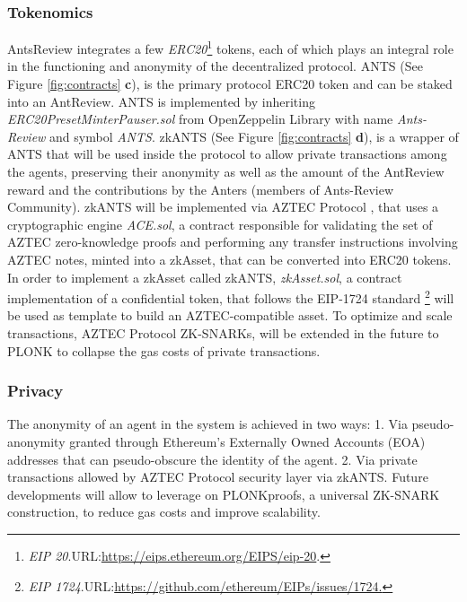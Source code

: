 \documentclass[runningheads]{llncs}
\begin{document}
\subsubsection{Tokenomics}
AntsReview integrates a few \emph{ERC20}\footnote[9]{\emph{EIP 20}.\textsc{URL:}\url{https://eips.ethereum.org/EIPS/eip-20}.} tokens, each of which plays an integral role in the functioning and anonymity of the decentralized protocol.
\newline ANTS (See Figure \ref{fig:contracts} \textbf{c}), is the primary protocol ERC20 token and can be staked into an AntReview.
\newline ANTS is implemented by inheriting \emph{ERC20PresetMinterPauser.sol} from OpenZeppelin Library with name \emph{Ants-Review} and symbol \emph{ANTS}.
\newline zkANTS (See Figure \ref{fig:contracts} \textbf{d}), is a wrapper of ANTS that will be used inside the protocol to allow private transactions among the agents, preserving their anonymity as well as the amount of the AntReview reward and the contributions by the Anters (members of Ants-Review Community).
\newline zkANTS will be implemented via AZTEC Protocol \cite{AZTEC}, that uses a cryptographic engine \emph{ACE.sol}, a contract responsible for validating the set of AZTEC zero-knowledge proofs and performing any transfer instructions involving AZTEC notes, minted into a zkAsset, that can be converted into ERC20 tokens. In order to implement a zkAsset called zkANTS, \emph{zkAsset.sol}, a contract implementation of a confidential token, that follows the EIP-1724 standard \footnote[10]{\emph{EIP  1724}.\textsc{URL:}\url{https://github.com/ethereum/EIPs/issues/1724.}} will be used as template to build an AZTEC-compatible asset.
\newline To optimize and scale transactions, AZTEC Protocol ZK-SNARKs, will be extended in the future to PLONK \cite{PLONK} to collapse the gas costs of private transactions.

\subsubsection{Privacy}
The anonymity of an agent in the system is achieved in two ways:
1. Via pseudo-anonymity granted through Ethereum's Externally Owned Accounts (EOA) addresses that can pseudo-obscure the identity of the agent.
2. Via private transactions allowed by AZTEC Protocol security layer via zkANTS. Future developments will allow to leverage on PLONK\cite{PLONK}proofs, a universal ZK-SNARK construction, to reduce gas costs and improve scalability.
\end{document}
